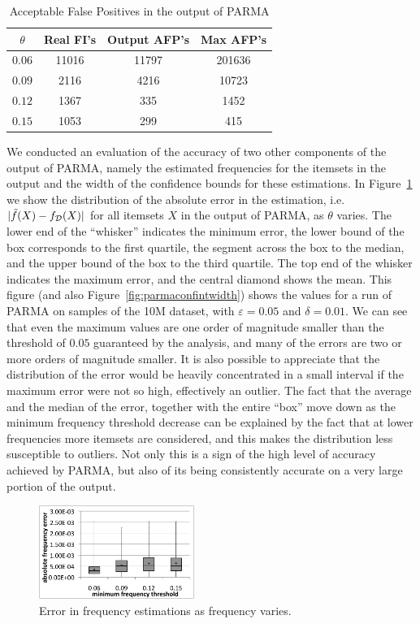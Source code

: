 \begin{table}
  \centering
  \begin{tabular}{cccc}
    \hline
    $\theta$ & Real FI's & Output AFP's & Max AFP's \\
    \hline
    $0.06$ & 11016 & 11797 & 201636 \\
    $0.09$ & 2116& 4216& 10723 \\
    $0.12$ & 1367& 335& 1452\\
    $0.15$ & 1053& 299& 415\\
    \hline
  \end{tabular}
  \caption{Acceptable False Positives in the output of PARMA}
  \label{tab:falsepositives}
\end{table}

We conducted an evaluation of the accuracy of two other components of the
output of PARMA, namely the estimated frequencies for the itemsets in the output
and the width of the confidence bounds for these estimations. In
Figure~\ref{fig:parmaabsfreqerr} we show the distribution of the absolute error in
the estimation, i.e. $|\tilde{f}(X)-f_{\cal D}(X)|$ for all itemsets $X$ in the
output of PARMA, as $\theta$ varies. The lower end of the ``whisker'' indicates the minimum error,
the lower bound of the box corresponds to the first quartile, the segment across
the box to the median, and the upper bound of the box to the third quartile. The
top end of the whisker indicates the maximum error, and the central diamond
shows the mean. This figure (and also Figure~\ref{fig:parmaconfintwidth}) shows the values
for a run of PARMA on samples of the 10M dataset, with $\varepsilon=0.05$ and
$\delta=0.01$. We can see that even the maximum values are one order of
magnitude smaller than the threshold of $0.05$ guaranteed by the analysis, and
many of the errors are two or more orders of magnitude smaller. It is also
possible to appreciate that the distribution of the error would be heavily concentrated in a
small interval if the maximum error were not so high, effectively an outlier.
The fact that the average and the median of the error, together with the entire ``box'' move down as the
minimum frequency threshold decrease can be explained by the fact that at lower
frequencies more itemsets are considered, and this makes the distribution less
susceptible to outliers. Not only this is a sign of the high level of accuracy
achieved by PARMA, but also of its being consistently accurate on
a very large portion of the output.

\begin{figure}[htb]
 \centering
    \includegraphics[width=0.45\textwidth]{parma/absfreqerr}
  \caption{Error in frequency estimations as frequency varies.}
  \label{fig:parmaabsfreqerr}
\end{figure}

